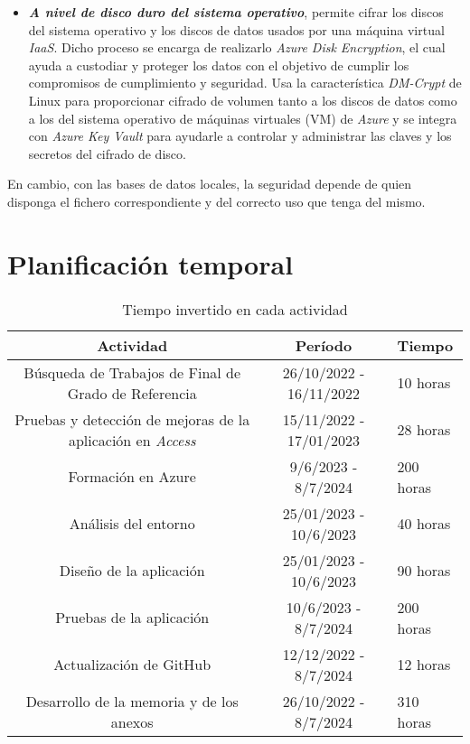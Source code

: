 \begin{itemize}
\begin{itemize}
\begin{itemize}
            \end{itemize}
            \item \textbf{\textit{A nivel de disco duro del sistema operativo}}, permite cifrar los discos del sistema operativo y los discos de datos usados por una máquina virtual \textit{IaaS}.
            Dicho proceso se encarga de realizarlo \textit{Azure Disk Encryption}, el cual ayuda a custodiar y proteger los datos con el objetivo de cumplir los compromisos de cumplimiento y seguridad. 
            Usa la característica \textit{DM-Crypt} de Linux para proporcionar cifrado de volumen tanto a los discos de datos como a los del sistema operativo de máquinas virtuales (VM) de \textit{Azure} 
            y se integra con \textit{Azure Key Vault} para ayudarle a controlar y administrar las claves y los secretos del cifrado de disco.
        \end{itemize}
        En cambio, con las bases de datos locales, la seguridad depende de quien disponga el fichero correspondiente y del correcto uso que tenga del mismo.
    \end{itemize}

\section{Planificación temporal}

\begin{table}[H]
	\centering
	\begin{tabularx}{\linewidth}{>{\tiny}c >{\tiny}c >{\tiny}X}
	  \toprule
	  Actividad & Período & Tiempo \\
	  \midrule
	  Búsqueda de Trabajos de Final de Grado de Referencia & 26/10/2022 - 16/11/2022 & 10 horas \\
	  Pruebas y detección de mejoras de la aplicación en \textit{Access} & 15/11/2022 - 17/01/2023 & 28 horas \\
	  Formación en Azure & 9/6/2023 - 8/7/2024 & 200 horas \\
	  Análisis del entorno & 25/01/2023 - 10/6/2023 & 40 horas \\
	  Diseño de la aplicación & 25/01/2023 - 10/6/2023 & 90 horas \\
	  Pruebas de la aplicación & 10/6/2023 - 8/7/2024 & 200 horas \\
	  Actualización de GitHub & 12/12/2022 - 8/7/2024 & 12 horas \\
	  Desarrollo de la memoria y de los anexos & 26/10/2022 - 8/7/2024 & 310 horas \\
	  \bottomrule
	\end{tabularx}
	\caption{Tiempo invertido en cada actividad}
	\label{tabla:tiempo-invertido}
\end{table}







